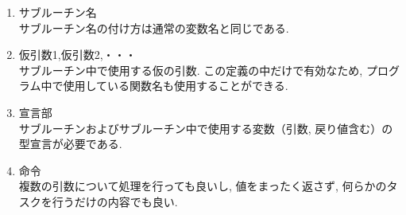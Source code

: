 \begin{enumerate}
\item サブルーチン名\\
サブルーチン名の付け方は通常の変数名と同じである.
\item 仮引数1,仮引数2,・・・\\
サブルーチン中で使用する仮の引数. この定義の中だけで有効なため,
プログラム中で使用している関数名も使用することができる.
\item 宣言部\\
サブルーチンおよびサブルーチン中で使用する変数（引数, 戻り値含む）の型宣言が必要である.
\item 命令\\
複数の引数について処理を行っても良いし, 値をまったく返さず, 何らかのタスクを行うだけの内容でも良い. \\
\end{enumerate}


\begin{comment}
\subsection*{$<$演習課題$>$}
フィボナッチ数列は大きい$k$に関して,
$\log(a_k) \approx k\log\left(\frac{1+\sqrt{5}}{2}\right)$
と近似できることが知られている.

$\log(k!)$ と同様に, 任意の$k$に関して, $\log(a_k)$の値を精度よく高効率に計算できる
機能をサブルーチンとして作成せよ.
\end{comment}


